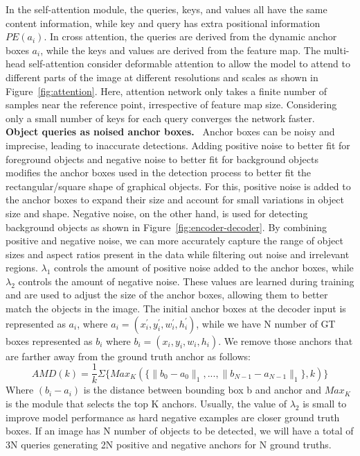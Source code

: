 \documentclass[sn-mathphys]{sn-jnl}\jyear{2021}\theoremstyle{thmstyleone}\newtheorem{theorem}{Theorem}\newtheorem{proposition}[theorem]{Proposition}\theoremstyle{thmstyletwo}\newtheorem{example}{Example}\newtheorem{remark}{Remark}\theoremstyle{thmstylethree}\newtheorem{definition}{Definition}\usepackage{amsmath}
\begin{document}
In the self-attention module, the queries, keys, and values all have the same content information, while key and query has extra positional information $PE (a_i)$. In cross attention, the queries are derived from the dynamic anchor boxes $a_i$, while the keys and values are derived from the feature map.
The multi-head self-attention consider deformable attention to allow the model to attend to different parts of the image at different resolutions and scales as shown in Figure~\ref{fig:attention}. Here, attention network only takes a finite number of samples near the reference point, irrespective of feature map size. Considering only a small number of keys for each query converges the network faster. \\
\noindent\textbf {Object queries as noised anchor boxes.}~
 Anchor boxes can be noisy and imprecise, leading to inaccurate detections. Adding positive noise to better fit for foreground objects and negative noise to better fit for background objects modifies the anchor boxes used in the detection process to better fit the rectangular/square shape of graphical objects. 
For this, positive noise is added to the anchor boxes to expand their size and account for small variations in object size and shape. Negative noise, on the other hand, is used for detecting background objects as shown in Figure~\ref{fig:encoder-decoder}. By combining positive and negative noise, we can more accurately capture the range of object sizes and aspect ratios present in the data while filtering out noise and irrelevant regions. $\lambda_1$ controls the amount of positive noise added to the anchor boxes, while $\lambda_2$ controls the amount of negative noise. These values are learned during training and are used to adjust the size of the anchor boxes, allowing them to better match the objects in the image. The initial anchor boxes at the decoder input is represented as $a_i$, where $a_i=(x^\prime_i,y^\prime_i,w^\prime_i,h^\prime_i)$, while we have N number of GT boxes represented as $b_i$ where $b_i=(x_i,y_i,w_i,h_i)$. We remove those anchors that are farther away from the ground truth anchor as follows: 
\begin{equation}
 AMD(k) = \frac{1}{k} \Sigma \{Max_K (\{\parallel b_0-a_0\parallel_1,...,\parallel b_{N-1}-a_{N-1}\parallel_1\},k )\}
\end{equation}
 Where $(b_i-a_i)$ is the distance between bounding box b and anchor and $Max_K$ is the module that selects the top K anchors. Usually, the value of $\lambda_2$ is small to improve model performance as hard negative examples are closer ground truth boxes. If an image has N number of objects to be detected, we will have a total of 3N queries generating 2N positive and negative anchors for N ground truths. \\
\end{document}

